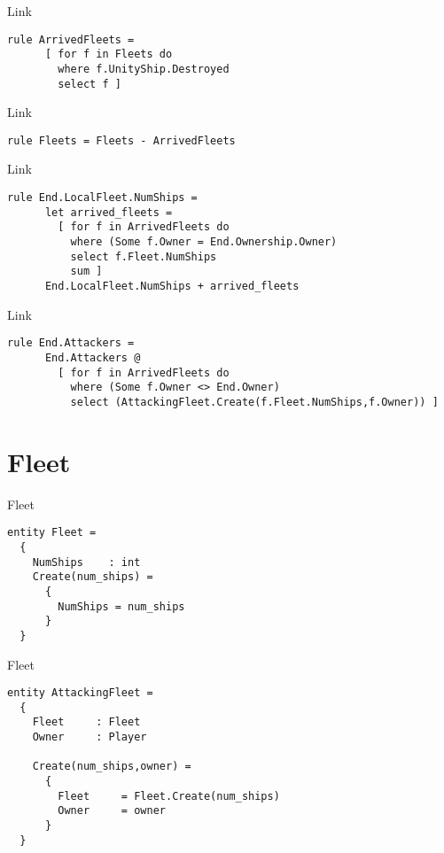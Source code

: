 \documentclass{beamer}
\begin{document}
\begin{frame}[fragile]{Link}
\begin{lstlisting}[frame=shadowbox]
    rule ArrivedFleets =  
      [ for f in Fleets do
        where f.UnityShip.Destroyed
        select f ]
\end{lstlisting}
\end{frame}

\begin{frame}[fragile]{Link}
\begin{lstlisting}[frame=shadowbox]
    rule Fleets = Fleets - ArrivedFleets
\end{lstlisting}
\end{frame}

\begin{frame}[fragile]{Link}
\begin{lstlisting}[frame=shadowbox]
    rule End.LocalFleet.NumShips =
      let arrived_fleets =
        [ for f in ArrivedFleets do
          where (Some f.Owner = End.Ownership.Owner)
          select f.Fleet.NumShips
          sum ]
      End.LocalFleet.NumShips + arrived_fleets
\end{lstlisting}
\end{frame}

\begin{frame}[fragile]{Link}
\begin{lstlisting}[frame=shadowbox]
    rule End.Attackers =
      End.Attackers @
        [ for f in ArrivedFleets do
          where (Some f.Owner <> End.Owner)
          select (AttackingFleet.Create(f.Fleet.NumShips,f.Owner)) ]
\end{lstlisting}
\end{frame}


\section{Fleet}
\begin{frame}[fragile]{Fleet}
\begin{lstlisting}[frame=shadowbox]
entity Fleet = 
  {
    NumShips    : int
    Create(num_ships) = 
      {
        NumShips = num_ships
      }      
  }
\end{lstlisting}
\end{frame}

\begin{frame}[fragile]{Fleet}
\begin{lstlisting}[frame=shadowbox]
entity AttackingFleet =
  {
    Fleet     : Fleet
    Owner     : Player

    Create(num_ships,owner) = 
      {
        Fleet     = Fleet.Create(num_ships)
        Owner     = owner
      }
  }
\end{lstlisting}
\end{frame}
\end{document}
